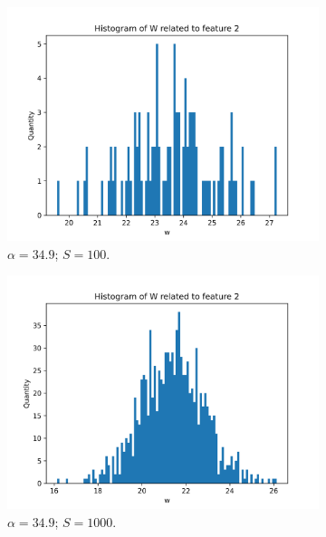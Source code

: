 \documentclass{article}
\begin{document}
\begin{figure}
\begin{subfigure}[t]{0.24\textwidth}
    \includegraphics[width=\linewidth]{hist_feat1_349000000_sample_100.png}
    \caption{$\alpha = 34.9$; $S = 100$.}
  \end{subfigure}
  \hfill
  \begin{subfigure}[t]{0.24\textwidth}
    \centering
    \includegraphics[width=\linewidth]{hist_feat1_349000000_sample_1000.png}
    \caption{$\alpha = 34.9$; $S = 1000$.}
  \end{subfigure}
  \hfill
  \begin{subfigure}[t]{0.24\textwidth}
    \centering

\end{subfigure}
\end{figure}
\end{document}
